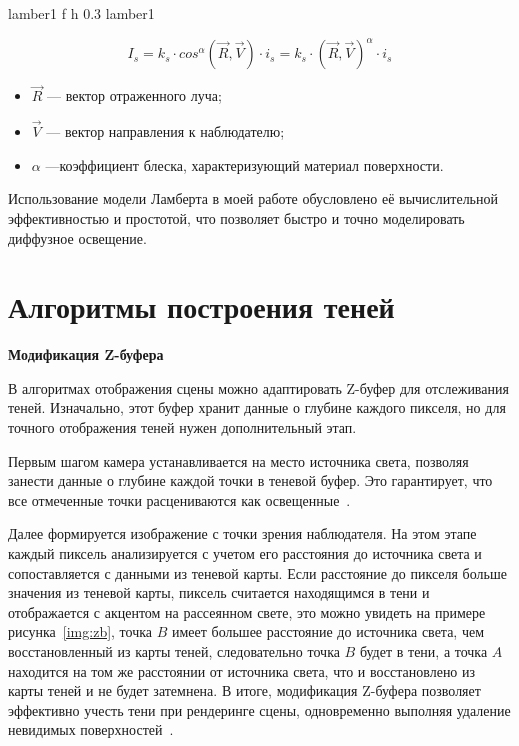 {lamber1} %
{f} %
{h} %
{0.3\textwidth} %
{lamber1} %


\begin{equation}
	I_{s}=k_{s} \cdot cos^{\alpha}(\vec R, \vec V) \cdot i_{s} = k_{s} \cdot (\vec R, \vec V)^{\alpha} \cdot i_{s}
\end{equation}

\begin{itemize}
	\item $\vec R$ --- вектор отраженного луча;
	\item $\vec V$ --- вектор направления к наблюдателю;
	\item $\alpha$ ---коэффициент блеска, характеризующий материал поверхности.
\end{itemize}


Использование модели Ламберта в моей работе обусловлено её вычислительной эффективностью и простотой, что позволяет быстро и точно моделировать диффузное освещение.
\fi

\section{Алгоритмы построения теней}

\textbf{Модификация Z-буфера}

В алгоритмах отображения сцены можно адаптировать Z-буфер для отслеживания теней.
Изначально, этот буфер хранит данные о глубине каждого пикселя, но для точного отображения теней нужен дополнительный этап.

Первым шагом камера устанавливается на место источника света, позволяя занести данные о глубине каждой точки в теневой буфер. Это гарантирует, что все отмеченные точки расцениваются как освещенные~\cite{letion}.

Далее формируется изображение с точки зрения наблюдателя. На этом этапе каждый пиксель анализируется с учетом его расстояния до источника света и сопоставляется с данными из теневой карты. Если расстояние до пикселя больше значения из теневой карты, пиксель считается находящимся в тени и отображается с акцентом на рассеянном свете, это можно увидеть на примере рисунка~\ref{img:zb}, точка $ B $ имеет большее расстояние до источника света, чем восстановленный из карты теней, следовательно точка $ B $ будет в тени, а точка $ A $  находится на том же расстоянии от источника света, что и восстановлено из карты теней и не будет затемнена. В итоге, модификация Z-буфера позволяет эффективно учесть тени при рендеринге сцены, одновременно выполняя удаление невидимых поверхностей~\cite{letion}.

